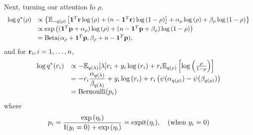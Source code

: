 \documentclass{amsart}[12pt]
\begin{document}
\noindent Next, turning our attention fo $\rho$,
\[
\begin{array}{rl}
	\log{q^*(\rho)} 
	  &                                                                 
	\propto \left\{ 
	{\mathbb E}_{-q(\rho)}\left[ 
	{\bf 1}^T{\bf r} \log{(\rho)} 
	+ (n - {\bf 1}^T{\bf r}) \log{(1 - \rho)} 
	\right] 
	+ \alpha_\rho \log{(\rho)} 
	+ \beta_\rho \log{(1 - \rho)} 
	\right\} 
	\\ [0.5ex]
	  &                                                                 
	\propto \exp \left( 
	({\bf 1}^T{\bf p} + \alpha_\rho) \log{(\rho)} 
	+ (n - {\bf 1}^T{\bf p} + \beta_\rho) \log{(1 - \rho)} 
	\right) 
	\\ [0.5ex]
	  & = \text{Beta}(\alpha_\rho + {\bf 1}^T{\bf p}, \beta_\rho + n - {\bf 1}^T{\bf p}), 
\end{array}
\]
\noindent and for ${\bf r}_i, i=1, \ldots, n$,
\[
\begin{array}{rl}
	\ds \log{q^*(r_i)} & \propto -\bE_{q(\lambda)} [\lambda ] r_i + y_i \log{(r_i)} + r_i \bE_{q(\rho)} \left[\log{\left(\frac{\rho}{1 - \rho}\right)}\right]          \\[0.5ex]
	                   & \ds = -r_i \frac{\alpha_{q(\lambda)}}{\beta_{q(\lambda)}} + y_i \log{(r_i)} + r_i \left(\psi(\alpha_{q(\rho)}) - \psi(\beta_{q(\rho)})\right) \\ [0.5ex]%
	                   & \ds = \text{Bernoulli}(p_i)                                                                                                                   
\end{array}
\]
\noindent where
\[
\begin{array}{rl}
	\displaystyle p_i                                               
	= \frac{\exp{(\eta_i)}}{\text{I}(y_i = 0) + \exp{(\eta_i)}}  
	= \text{expit}(\eta_i), \quad \mbox{(when $y_i = 0$)} 
\end{array}
\]
\end{document}
